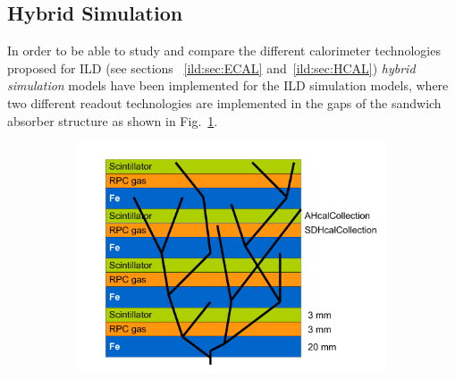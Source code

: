 \subsection{\label{sec:hybrid-sim} Hybrid Simulation}

In order to be able to study and compare the different calorimeter technologies proposed for ILD
(see sections ~\ref{ild:sec:ECAL} and~\ref{ild:sec:HCAL}) \emph{hybrid simulation} models have been implemented for the
ILD simulation models, where two different readout technologies are implemented in the
gaps of the sandwich absorber structure as shown in Fig.~\ref{fig:sim_hybrid_schema}.
%
\begin{figure}[b!]
\centering
  \begin{subfigure}{0.50\hsize}
    \includegraphics[width=\textwidth]{Modelling/fig/multi_technology_simulation.pdf}
    \caption{ \label{fig:sim_hybrid_schema}}
  \end{subfigure}
  \begin{subfigure}{0.49\hsize}

\end{subfigure}
\end{figure}

